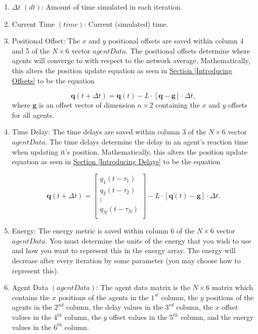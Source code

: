 \documentclass[../CourseManual.tex]{subfiles}
\begin{document}
\begin{enumerate}
    \item $\Delta t$ $(dt)$: Amount of time simulated in each iteration.
    
    \item Current Time $(time)$: Current (simulated) time.
    
    \item Positional Offset: The $x$ and $y$ positional offsets are saved within column 4 and 5 of the $N \times 6$ vector $agentData$. The positional offsets determine where agents will converge to with respect to the network average. Mathematically, this alters the position update equation as seen in \hyperref[Introducing Offsets]{Section \ref{Introducing Offsets}} to be the equation
    
    $$
    \boldsymbol{q}(t+\Delta t) = \boldsymbol{q}(t) - L \cdot [\boldsymbol{q} - \boldsymbol{g}] \cdot \Delta t,
    $$
    where $\boldsymbol{g}$ is an offset vector of dimension $n \times 2$ containing the $x$ and $y$ offsets for all agents.
    
    \item Time Delay: The time delays are saved within column 3 of the $N \times 6$ vector $agentData$. The  time delays determine the delay in an agent's reaction time when updating it's position. Mathematically, this alters the position update equation as seen in \hyperref[Introducing Delays]{Section \ref{Introducing Delays}} to be the equation

    $$
    \boldsymbol{q}(t+\Delta t) =
    \begin{bmatrix}
    q_1(t-\tau_1)\\
    q_2(t-\tau_2)\\
    \vdots \\
    q_N(t-\tau_N)\\
    \end{bmatrix}
    - L \cdot [\boldsymbol{q}(t) - \boldsymbol{g}] \cdot \Delta t.
    $$
    
    \item Energy: The energy metric is saved within column 6 of the $N \times 6$ vector $agentData$. You must determine the units of the energy that you wish to use and how you want to represent this in the energy array. The energy will decrease after every iteration by some parameter (you may choose how to represent this).
    
    \item Agent Data $(agentData)$: The agent data matrix is the $N \times 6$ matrix which contains the $x$ positions of the agents in the $1^{st}$ column, the $y$ positions of the agents in the $2^{nd}$ column, the delay values in the $3^{rd}$ column, the $x$ offset values in the $4^{th}$ column, the $y$ offset values in the $5^{th}$ column, and the energy values in the $6^{th}$ column.
    
\end{enumerate}
\end{document}
